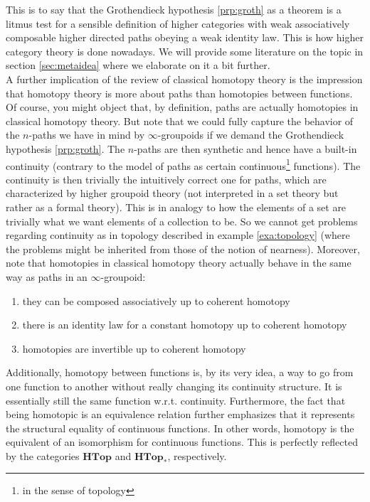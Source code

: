 This is to say that the Grothendieck hypothesis \ref{prp:groth} as a theorem is a litmus test for a sensible definition of higher categories with weak associatively composable higher directed paths obeying a weak identity law.
This is how higher category theory is done nowadays.
We will provide some literature on the topic in section \ref{sec:metaidea} where we elaborate on it a bit further.
\\
A further implication of the review of classical homotopy theory is the impression that homotopy theory is more about paths than homotopies between functions.
Of course, you might object that, by definition, paths are actually homotopies in classical homotopy theory.
But note that we could fully capture the behavior of the $n$-paths we have in mind by $\infty$-groupoids if we demand the Grothendieck hypothesis \ref{prp:groth}.
The $n$-paths are then {\glqq}synthetic{\grqq} and hence have a built-in continuity (contrary to the model of paths as certain continuous\footnote{in the sense of topology} functions).
The {\glqq}continuity{\grqq} is then trivially the intuitively correct one for paths, which are characterized by higher groupoid theory (not interpreted in a set theory but rather as a formal theory).
This is in analogy to how the elements of a set are trivially what we want elements of a collection to be.
So we cannot get problems regarding continuity as in topology described in example \ref{exa:topology} (where the problems might be inherited from those of the notion of nearness).
Moreover, note that homotopies in classical homotopy theory actually behave in the same way as paths in an $\infty$-groupoid:
\begin{enumerate}
\item[(1)]
they can be composed associatively up to coherent homotopy
\item[(2)]
there is an identity law for a constant homotopy up to coherent homotopy
\item[(3)]
homotopies are invertible up to coherent homotopy
\end{enumerate}
Additionally, homotopy between functions is, by its very idea, a way to go from one function to another without really changing its continuity structure.
It is essentially still the same function w.r.t. continuity.
Furthermore, the fact that being homotopic is an equivalence relation further emphasizes that it represents the structural equality of continuous functions.
In other words, homotopy is the equivalent of an isomorphism for continuous functions.
This is perfectly reflected by the categories $\mathbf{HTop}$ and $\mathbf{HTop}_{\ast}$, respectively.
